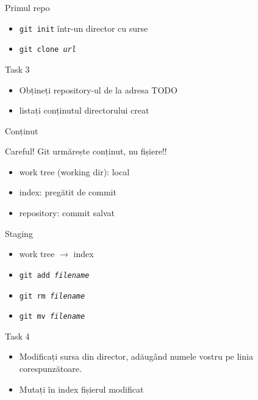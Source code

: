 \documentclass{beamer}
\begin{document}
\begin{frame}{Primul repo}
  \begin{itemize}
    \item \texttt{git init} într-un director cu surse
    \item \texttt{git clone \textit{url}}
  \end{itemize}
  \pause
  \begin{alertblock}{Task 3}
    \begin{itemize}
      \item Obțineți repository-ul de la adresa TODO
      \item listați conținutul directorului creat
    \end{itemize}
  \end{alertblock}
\end{frame}

\begin{frame}{Conținut}
  \begin{alertblock}{Careful!}
    Git urmărește conținut, nu fișiere!!
  \end{alertblock}
  \pause
  \begin{itemize}
    \item work tree (working dir): local
    \item index: pregătit de commit
    \item repository: commit salvat
  \end{itemize}
\end{frame}

\begin{frame}{Staging}
  \begin{itemize}
    \item work tree $\rightarrow$ index
    \item \texttt{git add \textit{filename}}
    \item \texttt{git rm \textit{filename}}
    \item \texttt{git mv \textit{filename}}
  \end{itemize}
  \pause
  \begin{alertblock}{Task 4}
    \begin{itemize}
      \item Modificați sursa din director, adăugând numele vostru pe linia
      corespunzătoare.
      \item Mutați în index fișierul modificat
    \end{itemize}
  \end{alertblock}
\end{frame}
\end{document}
